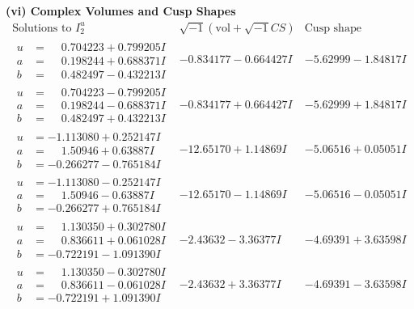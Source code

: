 \documentclass[1p]{elsarticle_modified}
\theoremstyle{definition}
\newcommand{\I}{\sqrt{-1}}
\begin{document}
\newpage\flushleft \textbf{(vi) Complex Volumes and Cusp Shapes}
$$\begin{array}{c|c|c}  
\text{Solutions to }I^u_{2}& \I (\text{vol} + \sqrt{-1}CS) & \text{Cusp shape}\\
 \hline 
\begin{aligned}
u &= \phantom{-}0.704223 + 0.799205 I \\
a &= \phantom{-}0.198244 + 0.688371 I \\
b &= \phantom{-}0.482497 - 0.432213 I\end{aligned}
 & -0.834177 - 0.664427 I & -5.62999 - 1.84817 I \\ \hline\begin{aligned}
u &= \phantom{-}0.704223 - 0.799205 I \\
a &= \phantom{-}0.198244 - 0.688371 I \\
b &= \phantom{-}0.482497 + 0.432213 I\end{aligned}
 & -0.834177 + 0.664427 I & -5.62999 + 1.84817 I \\ \hline\begin{aligned}
u &= -1.113080 + 0.252147 I \\
a &= \phantom{-}1.50946 + 0.63887 I \\
b &= -0.266277 - 0.765184 I\end{aligned}
 & -12.65170 + 1.14869 I & -5.06516 + 0.05051 I \\ \hline\begin{aligned}
u &= -1.113080 - 0.252147 I \\
a &= \phantom{-}1.50946 - 0.63887 I \\
b &= -0.266277 + 0.765184 I\end{aligned}
 & -12.65170 - 1.14869 I & -5.06516 - 0.05051 I \\ \hline\begin{aligned}
u &= \phantom{-}1.130350 + 0.302780 I \\
a &= \phantom{-}0.836611 + 0.061028 I \\
b &= -0.722191 - 1.091390 I\end{aligned}
 & -2.43632 - 3.36377 I & -4.69391 + 3.63598 I \\ \hline\begin{aligned}
u &= \phantom{-}1.130350 - 0.302780 I \\
a &= \phantom{-}0.836611 - 0.061028 I \\
b &= -0.722191 + 1.091390 I\end{aligned}
 & -2.43632 + 3.36377 I & -4.69391 - 3.63598 I \\ \hline\begin{aligned}

\end{aligned}
\end{array}$$
\end{document}
